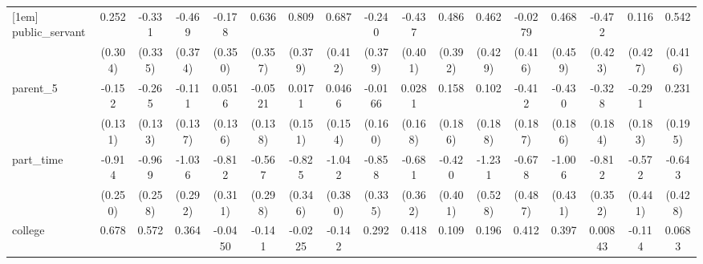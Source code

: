 {\begin{tabular}{l*{16}{c}}
[1em]
public\_servant      &       0.252         &      -0.331         &      -0.469         &      -0.178         &       0.636         &       0.809\sym{*}  &       0.687         &      -0.240         &      -0.437         &       0.486         &       0.462         &     -0.0279         &       0.468         &      -0.472         &       0.116         &       0.542         \\
                    &     (0.304)         &     (0.335)         &     (0.374)         &     (0.350)         &     (0.357)         &     (0.379)         &     (0.412)         &     (0.379)         &     (0.401)         &     (0.392)         &     (0.429)         &     (0.416)         &     (0.459)         &     (0.423)         &     (0.427)         &     (0.416)         \\
[1em]
parent\_5            &      -0.152         &      -0.265\sym{*}  &      -0.111         &      0.0516         &     -0.0521         &      0.0171         &      0.0466         &     -0.0166         &      0.0281         &       0.158         &       0.102         &      -0.412\sym{*}  &      -0.430\sym{*}  &      -0.328         &      -0.291         &       0.231         \\
                    &     (0.131)         &     (0.133)         &     (0.137)         &     (0.136)         &     (0.138)         &     (0.151)         &     (0.154)         &     (0.160)         &     (0.168)         &     (0.186)         &     (0.188)         &     (0.187)         &     (0.186)         &     (0.184)         &     (0.183)         &     (0.195)         \\
[1em]
part\_time           &      -0.914\sym{***}&      -0.969\sym{***}&      -1.036\sym{***}&      -0.812\sym{**} &      -0.567         &      -0.825\sym{*}  &      -1.042\sym{**} &      -0.858\sym{*}  &      -0.681         &      -0.420         &      -1.231\sym{*}  &      -0.678         &      -1.006\sym{*}  &      -0.812\sym{*}  &      -0.572         &      -0.643         \\
                    &     (0.250)         &     (0.258)         &     (0.292)         &     (0.311)         &     (0.298)         &     (0.346)         &     (0.380)         &     (0.335)         &     (0.362)         &     (0.401)         &     (0.528)         &     (0.487)         &     (0.431)         &     (0.352)         &     (0.441)         &     (0.428)         \\
[1em]
college             &       0.678\sym{***}&       0.572\sym{**} &       0.364         &     -0.0450         &      -0.141         &     -0.0225         &      -0.142         &       0.292         &       0.418         &       0.109         &       0.196         &       0.412         &       0.397         &     0.00843         &      -0.114         &      0.0683         \\

\end{tabular}}
